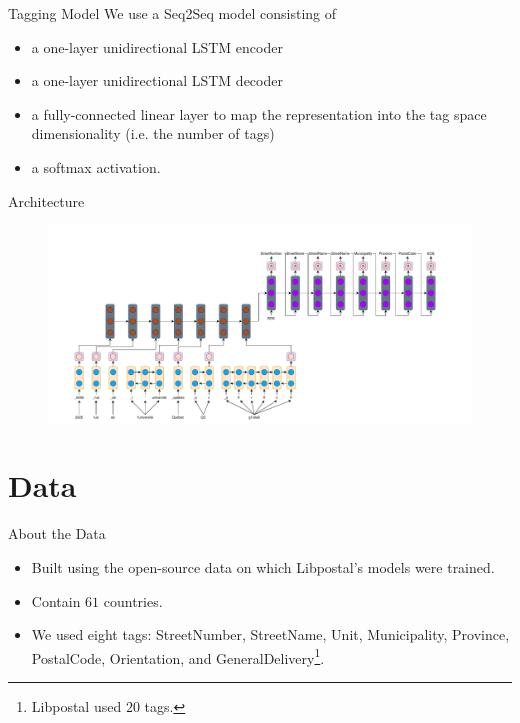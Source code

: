 \documentclass{beamer}
\begin{document}
	\begin{frame}{Tagging Model}
		We use a Seq2Seq model consisting of
		\begin{itemize}
			\item<2-> a one-layer unidirectional LSTM encoder
			\item<3-> a one-layer unidirectional LSTM decoder
			\item<4-> a fully-connected linear layer to map the representation into the tag space dimensionality (i.e. the number of tags)
			\item<5-> a softmax activation. 
		\end{itemize}
		
	\end{frame}

	\begin{frame}{Architecture}
		\begin{figure}[h!]
			\centering
			\includegraphics[width=1.1\textwidth,height=\textheight,keepaspectratio]{Network.pdf}
		\end{figure}
	\end{frame}
	
	\section{Data}
	\begin{frame}{About the Data}
		\begin{itemize}
			\item<1-> Built using the open-source data on which Libpostal's models were trained.
			\item<2-> Contain $61$ countries.
			\item<2-> We used eight tags: StreetNumber, StreetName, Unit, Municipality, Province, PostalCode, Orientation, and GeneralDelivery\footnote{Libpostal used $20$ tags.}.
		\end{itemize}
	\end{frame}	
\end{document}
